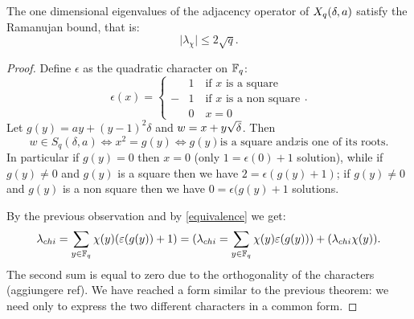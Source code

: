 \begin{cor}
	The one dimensional eigenvalues of the adjacency operator of $X_q (\delta ,a)$ satisfy the Ramanujan bound, that is:
\begin{equation*}
	\vert \lambda_{\chi} \vert \le 2\sqrt{q}.
\end{equation*}
\begin{proof}
	Define $\epsilon$ as the quadratic character on ${\mathbb F}_q$:
\begin{equation*}
	\epsilon (x)=\begin{cases}&1 \quad \text{if $x$ is a square}\\ -&1 \quad \text{if $x$ is a non square}\\ &0 \quad x=0 \end{cases}.
\end{equation*}
Let $g(y)=ay+(y-1)^2 \delta$ and $w=x+y\sqrt{\delta}$. Then
\begin{equation}\label{equivalence}
w \in S_q(\delta,a) \iff x^2=g(y) \iff g(y) \text{is a square and} x \text{is one of its roots}.
\end{equation}
In particular if $g(y)=0$ then $x=0$ (only $1=\epsilon(0)+1$ solution), while if $g(y)\neq 0$ and $g(y)$ is a square then we have
$2=\epsilon (g(y)+1)$; if $g(y)\neq 0$ and $g(y)$ is a non square then we have $0=\epsilon (g(y)+1$ solutions.

By the previous observation and by \ref{equivalence} we get:
\begin{equation}
\lambda_{chi}=\sum_{y \in {\mathbb F}_q} \chi (y)(\varepsilon(g(y))+1)=(\lambda_{chi}=
\sum_{y \in {\mathbb F}_q}\chi (y)\varepsilon(g(y)))+(\lambda_{chi}\chi (y)).
\end{equation}
The second sum is equal to zero due to the orthogonality of the characters (aggiungere ref).
We have reached a form similar to the previous theorem: we need only to express the two different characters in a common form.


\end{proof}
\end{cor}
